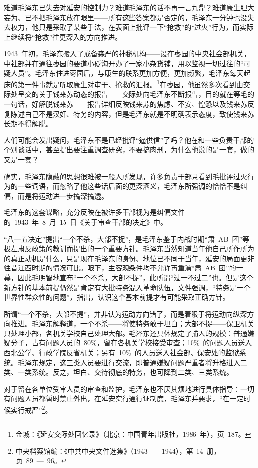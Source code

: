 难道毛泽东已失去对延安的控制力？难道毛泽东的话不再一言九鼎？难道康生胆大妄为、已不把毛泽东放在眼里——所有这些答案都是否定的，毛泽东一分钟也没失去权力，他只是采取了某些手法，在表面上批评一下“抢救”的“过火”行为，而实际上继续将“抢救”往更深入的方向推进。

1943~年初，毛泽东搬入了戒备森严的神秘机构——设在枣园的中央社会部机关，中社部并在通往枣园的要道小砭沟开办了一家小杂货铺，用以监视一切过往的“可疑人员”。毛泽东住进枣园后，与康生的联系更加方便，更加频繁，毛泽东每天起床的第一件事就是听取康生对审干、抢救的汇报。\footnote{金城：《延安交际处回忆录》（北京：中国青年出版社，1986~年），页~187。}在枣园，他虽然多次看到由交际处呈交的关于钱来苏动态的报告——交际处向毛泽东不断报告，目的就在等毛的一句话，好解脱钱来苏——报告详细反映钱来苏的焦虑、不安、惶恐以及钱来苏反复陈述白己不是汉奸、特务的内容，但是毛泽东就是不明确表示态度，致使钱来苏长期不得解脱。

人们可能会发出疑问，毛泽东不是已经批评“逼供信”了吗？他在和一些负责干部的个别谈话中，甚至提出要注重调查研究，不要搞肉刑，为什么他说的是一套，做的又是一套？

确实，毛泽东隐蔽的思想很难被一般人所发现，许多负责干部只看到毛批评过火行为的一些词语，而忽略了他这些话后面的更深涵义，毛泽东所强调的恰恰不是纠偏，而是将运动进一步搞深搞透。

毛泽东的这套谋略，充分反映在被许多干部视为是纠偏文件的~1943~年~8~月~15~日《关于审查干部的决定》中。

“八一五决定”提出“一个不杀，大部不捉”，是毛泽东鉴于内战时期“肃~AB~团”等极左肃反政策的教训而提出的一个重要方针。毛泽东当然知道当年他自己所作所为的真正动机是什么，只是现在毛泽东的身份、地位已不同于当年，延安的局面更非往昔江西时期的情况可比。眼下，主客观条件均不允许再重演“肃~AB~团”的一幕，因此毛明智地宣布“一个不杀，大部不捉”，此所谓“过一不过二”也。但是这个新方针的基本前提仍然是肯定有大批特务混入革命队伍，文件强调，“特务是一个世界性群众性的问题”，指出，认识这个基本前提才有可能采取正确方针。

所谓“一个不杀，大部不提”，并非认为运动方向错了，而是着眼于将运动向纵深方向推进。毛泽东解释道，一个不杀——将使特务敢于坦白；大部不捉——保卫机关只处理小部，各机关学校自己处理大部。毛泽东还具体规定了捕人的规模：普通嫌疑分子，占有问题人员的~80\%，留在各机关学校接受审查；10\%~的问题人员送入西北公学、行政学院反省机关；另有~10\%~的人员送入社会部、保安处的监狱系统。毛泽东规定，这三类人员要进行交流，即普通嫌疑问题严重者将升格进入二类、一类系统。反之，坦白、交待彻底的特务，也可降到二类、三类系统。

对于留在各单位受审人员的审查和监护，毛泽东也不厌其烦地进行具体指导：一切有问题人员都暂时禁止外出，在延安实行通行证制度，毛泽东并要求，“在一定时候实行戒严”\footnote{中央档案馆编：《中共中央文件选集》（1943~—~1944），第~14~册，页~89~—~96。}。

